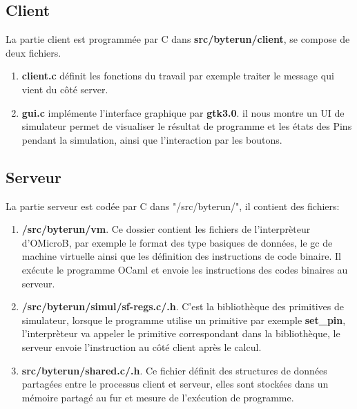 \documentclass[14px]{article}
\begin{document}
\subsection{Client}
La partie client est programmée par C dans \textbf{src/byterun/client}, se compose de deux fichiers.
\begin{enumerate}
\item \textbf{client.c} définit les fonctions du travail par exemple traiter le message qui vient du côté server.

\item \textbf{gui.c} implémente l'interface graphique par \textbf{gtk3.0}.
il nous montre un UI de simulateur permet de visualiser le résultat de programme et les états des Pins pendant la simulation, ainsi que l'interaction par les boutons.\\
\end{enumerate}

\subsection{Serveur}
La partie serveur est codée par C dans "/src/byterun/", il contient des fichiers:
\begin{enumerate}
\item \textbf{/src/byterun/vm}.
Ce dossier contient les fichiers de l'interprèteur d'OMicroB, par exemple le format des type basiques de données, le gc de machine virtuelle ainsi que les définition des instructions de code binaire. Il exécute le programme OCaml et envoie les instructions des codes binaires au serveur.

\item \textbf{/src/byterun/simul/sf-regs.c/.h}.
C'est la bibliothèque des primitives de simulateur, lorsque le programme utilise un primitive par exemple \textbf{set\_pin}, l'interprèteur va appeler le primitive correspondant dans la bibliothèque, le serveur envoie l'instruction au côté client après le calcul.

\item \textbf{src/byterun/shared.c/.h}.
Ce fichier définit des structures de données partagées
entre le processus client et serveur, elles sont stockées dans un mémoire partagé au fur et mesure de l'exécution de programme.
\end{enumerate}


\clearpage
\pagestyle{fancy}
\rhead{\thepage}
\fancyfoot{}
\end{document}

